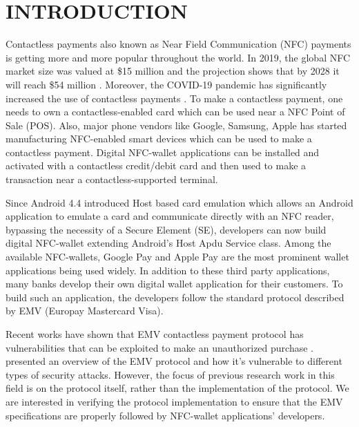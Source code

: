 \chapter{INTRODUCTION}
\label{chapter:introduction}

Contactless payments also known as Near Field Communication \cite{want2011near} (NFC) payments is getting more 
and more popular throughout the world. In 2019, the global NFC market size was valued at \$15 million and the 
projection shows that by 2028 it will reach \$54 million \cite{nfcmarket}. Moreover, the COVID-19 pandemic has 
significantly increased the use of contactless payments \cite{contactlesscovid}. 
To make a contactless payment, one needs to own a contactless-enabled card which can be used near a NFC Point of 
Sale (POS). Also, major phone vendors like Google, Samsung, Apple has started manufacturing NFC-enabled smart 
devices which can be used to make a contactless payment. Digital NFC-wallet applications can be installed and 
activated with a contactless credit/debit card and then used to make a transaction near a contactless-supported 
terminal.  

Since Android 4.4 introduced Host based card emulation \cite{hostbased} which allows an Android application to 
emulate a card and communicate directly with an NFC reader, bypassing the necessity of a Secure Element (SE), 
developers can now build digital NFC-wallet extending Android's Host Apdu Service class\cite{hostapdu}. Among the 
available NFC-wallets, Google Pay\cite{gpay} and Apple Pay are the most prominent wallet applications being used 
widely. In addition to these third party applications, many banks develop their own digital wallet application for 
their customers. To build such an application, the developers follow the standard protocol described by 
EMV (Europay Mastercard Visa)\cite{van2016emv}. 

Recent works have shown that EMV contactless payment protocol \cite{emvco} has vulnerabilities that can be 
exploited to make an unauthorized purchase \cite{emms2016contactless}\cite{francis2009potential}. 
\citet{emvandvulnerabilities} presented an overview of the EMV protocol and how it's vulnerable to different 
types of security attacks. However, the focus of previous research work in this field is on the protocol itself, 
rather than the implementation of the protocol. We are interested in verifying the protocol implementation to 
ensure that the EMV specifications are properly followed by NFC-wallet applications' developers.

